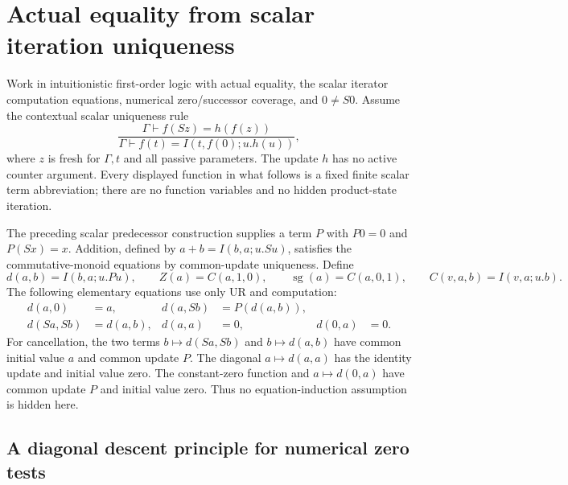 
\section{Actual equality from scalar iteration uniqueness}
\label{sec:ur-reflection-completion}

Work in intuitionistic first-order logic with actual equality, the scalar
iterator computation equations, numerical zero/successor coverage, and
$0\ne S0$. Assume the contextual scalar uniqueness rule
\[
 \frac{\Gamma\vdash f(Sz)=h(f(z))}
      {\Gamma\vdash f(t)=I(t,f(0);u.h(u))},
 \tag{UR}
\]
where $z$ is fresh for $\Gamma,t$ and all passive parameters. The update
$h$ has no active counter argument. Every displayed function in what
follows is a fixed finite scalar term abbreviation; there are no function
variables and no hidden product-state iteration.

The preceding scalar predecessor construction supplies a term $P$ with
$P0=0$ and $P(Sx)=x$. Addition, defined by
$a+b=I(b,a;u.Su)$, satisfies the commutative-monoid equations by common-update
uniqueness. Define
\[
 d(a,b)=I(b,a;u.Pu),\qquad
 Z(a)=C(a,1,0),\qquad \operatorname{sg}(a)=C(a,0,1),
 \qquad C(v,a,b)=I(v,a;u.b).
\]
The following elementary equations use only UR and computation:
\begin{equation}
\begin{aligned}
 d(a,0)&=a,&d(a,Sb)&=P(d(a,b)),\\
 d(Sa,Sb)&=d(a,b),&d(a,a)&=0,&d(0,a)&=0.
\end{aligned}
 \label{eq:ur-monus-basics}
\end{equation}
For cancellation, the two terms $b\mapsto d(Sa,Sb)$ and $b\mapsto d(a,b)$
have common initial value $a$ and common update $P$. The diagonal
$a\mapsto d(a,a)$ has the identity update and initial value zero. The
constant-zero function and $a\mapsto d(0,a)$ have common update $P$ and
initial value zero. Thus no equation-induction assumption is hidden here.

\subsection{A diagonal descent principle for numerical zero tests}

